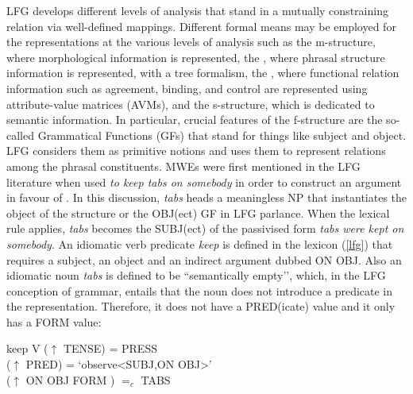 \documentclass[output=paper]{langsci/langscibook}
\begin{document}
LFG develops different levels of analysis that stand in a mutually constraining relation via well-defined mappings. Different formal means may be employed for the representations at the various levels of analysis such as the m-structure, where morphological information is represented, the , where phrasal structure information is represented, with a tree formalism, the , where  functional relation information such as agreement, binding, and control are represented using attribute-value matrices (AVMs),  and the s-structure, which is dedicated to semantic information. In particular, crucial features of the f-structure are the so-called Grammatical Functions (GFs) that stand for things like subject and object. LFG considers them as primitive notions and uses them to represent relations among the phrasal constituents. 
MWEs were first mentioned in the LFG literature when \citet{Bresnan:82}   used {\em to keep tabs on somebody} in order to construct an argument in favour of .  In this discussion, \textit{tabs} heads a meaningless NP that instantiates the object of the structure or the OBJ(ect) GF in LFG parlance. When the  lexical rule applies, \textit{tabs} becomes the SUBJ(ect) of the passivised form \textit{tabs were kept on somebody}. An idiomatic verb predicate \textit{keep} is defined in the lexicon (\ref{lfg}) that requires a subject, an object and an indirect argument dubbed ON OBJ.  Also an idiomatic noun \textit{tabs} is defined to be ``semantically empty'’, which, in the LFG conception of grammar, entails that the noun does not introduce a predicate in the representation. Therefore, it does not have a PRED(icate) value and it only has a FORM value:

\ea \label{lfg}
keep  V ($\uparrow$ TENSE) = PRESS\\
          ($\uparrow$ PRED) = `observe<SUBJ,ON OBJ>’\\
          ($\uparrow$ ON OBJ FORM ) $=_c$ TABS\\
\z
\end{document}
